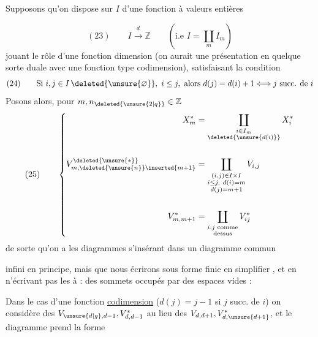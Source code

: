  Supposons qu'on dispose sur $I$ d'une fonction à valeurs entières


\[
(23)\qquad I\xrightarrow{\underline{d}}\mathbb Z
\qquad (\text{i.e } I=\coprod_m I_m)
\]
jouant le rôle d'une fonction dimension
(on aurait une présentation en quelque sorte
duale avec une fonction type codimension),
satisfaisant la condition
\[
(24)\qquad\text{Si }i,j\in I\,\deleted{\unsure{\varnothing}},\ i\leq j,\text{ alors }d(j)=d(i)+1\Longleftrightarrow j\text{ succ. de }i
\]
Posons alors, pour $m,n_{\deleted{\unsure{2|q}}}\in\mathbb Z$
\[
(25)\qquad\left\{\begin{aligned}
X_m^*&=\coprod_{\substack{i\in I_m\\\deleted{\unsure{d(i)}}}}X_i^*\\[1.5em]
V_{m,\deleted{\unsure{n}}\inserted{m+1}}^{\deleted{\unsure{*}}}&=\coprod_{\substack{(i,j)\in I\times I\\i\leq j,\ d(i)=m\\d(j)=m+1}}V_{i,j}\\[1.5em]
V_{m,m+1}^*&=\coprod_{\substack{i,j\text{ comme}\\\text{dessus}}}V_{ij}^*
\end{aligned}\right.
\]
de sorte qu'on a les diagrammes
s'insérant dans un diagramme commun %

infini en principe, mais que nous
écrirons sous forme finie en 
simplifier ,  et en n'écrivant pas les
   à : des
sommets occupés par des espaces vides :

Dans le cas d'une fonction \uline{codimension}
(\uline{$d(j)=j-1$} si $j$ succ. de $i$) on  considère
des $V_{\unsure{d|g},d-1},V_{d,d-1}^*$ au lieu des $V_{d,d+1},V_{d,\unsure{d+1}}^*$,
et le diagramme prend la forme


